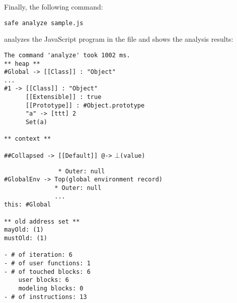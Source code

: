 \noindent
Finally, the following command:
\begin{verbatim}
safe analyze sample.js
\end{verbatim}
analyzes the JavaScript program in the file and shows the analysis results:
{\small
\begin{verbatim}
The command 'analyze' took 1002 ms.
** heap **
#Global -> [[Class]] : "Object"
...
#1 -> [[Class]] : "Object"
      [[Extensible]] : true
      [[Prototype]] : #Object.prototype
      "a" -> [ttt] 2
      Set(a)

** context **
\end{verbatim}
\vspace*{-.6em}
\verb!##Collapsed -> [[Default]] @->! $\bot$\verb!(value)!
\vspace*{-.6em}
\begin{verbatim}
               * Outer: null
#GlobalEnv -> Top(global environment record)
              * Outer: null
              ...
this: #Global

** old address set **
mayOld: (1)
mustOld: (1)

- # of iteration: 6
- # of user functions: 1
- # of touched blocks: 6
    user blocks: 6
    modeling blocks: 0
- # of instructions: 13
\end{verbatim}
}
